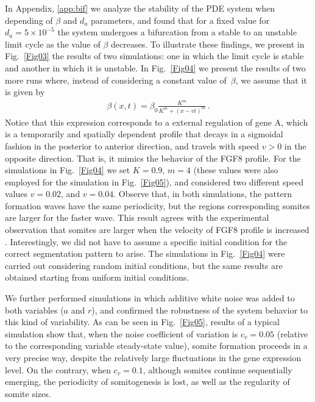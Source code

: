 \documentclass[11pt]{article}
\begin{document}
	In Appendix, \ref{app:bif} we analyze the stability of the PDE system when 
	depending of $\beta$ and $d_a$ parameters, and found that for a fixed value 
	for $d_a=5\times10^{-5}$ the system undergoes a bifurcation	from a stable to 
	an unstable limit cycle as the value of $\beta$ decreases. To illustrate these 
	findings, we present in Fig.~\ref{Fig03} the results of two
	simulations: one in which the limit cycle is stable and another in which it is
	unstable. In Fig.~\ref{Fig04} we present the results of two more runs where,
	instead of considering a constant value of~$\beta$, we assume that it is given
	by 
	\begin{gather}\label{eqbeta}
	\beta(x, t) = \beta_0 \frac{K^m}{K^m + (x - v t)^m}\,.
	\end{gather}
	Notice that this expression corresponds to a external regulation of gene A, which 
	is a temporarily and spatially dependent profile that decays in a sigmoidal 
	fashion in the posterior to anterior direction, and travels with speed
	$v>0$ in the opposite direction. That is, it mimics the behavior of the FGF8
	profile. For the simulations in Fig.~\ref{Fig04} we set $K =0.9 $, $m = 4 $
	(these values were also employed for the simulation in Fig.~\ref{Fig05}), and
	considered two different speed values $v = 0.02 $, and $v = 0.04$. Observe that, in
	both simulations, the pattern formation waves have the same periodicity, but the
	regions corresponding somites are larger for the faster wave. This result agrees
	with the experimental observation that somites are	larger when the velocity of 
	FGF8 profile is increased \citep{Sawada2001}. Interestingly, we did not have to 
	assume a specific initial condition for the correct segmentation pattern to arise.
	The simulations in Fig.~\ref{Fig04} were carried out considering random initial 
	conditions, but the same results are obtained starting from uniform initial 
	conditions. 
	
	We further performed simulations in which additive white noise was added to
	both variables ($a$ and $r$), and confirmed the robustness of the system
	behavior to this kind of variability. As can be seen in Fig.~\ref{Fig05},
	results of a typical simulation show that, when the noise coefficient of
	variation is $c_v = 0.05$ (relative to the corresponding variable 
	steady-state value), somite formation proceeds in a very precise way,
	despite the relatively large fluctuations in the gene expression level. On the
	contrary, when $c_v = 0.1$, although somites continue sequentially emerging, the
	periodicity of somitogenesis is lost, as well as the regularity of somite sizes.
	
\end{document}

